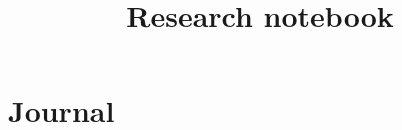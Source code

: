 \documentclass[11pt]{article}
\title{Research notebook}
\date{}
\begin{document}
\maketitle

\section{Journal}

\end{document}
